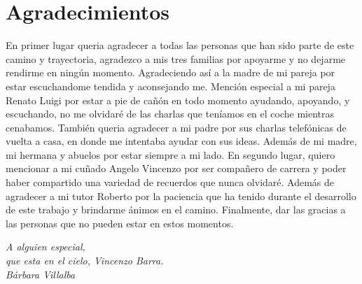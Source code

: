 \cleardoublepage

\chapter*{Agradecimientos}

En primer lugar queria agradecer a todas las personas que han sido parte de este camino y trayectoria, agradezco a mis tres familias por apoyarme y no 
dejarme rendirme en ningún momento. Agradeciendo así a la madre de mi pareja por estar escuchandome tendida y aconsejando me. \newline
\newline
Mención especial a mi pareja Renato Luigi por estar a pie de cañón en todo momento ayudando, apoyando, y escuchando, no me olvidaré de las charlas que teníamos
en el coche mientras cenabamos. También queria agradecer a mi padre por sus charlas telefónicas de vuelta a casa, en donde me intentaba ayudar con sus ideas. Además de mi madre,
mi hermana y abuelos por estar siempre a mi lado.\newline
\newline
En segundo lugar, quiero mencionar a mi cuñado Angelo Vincenzo por ser compañero de carrera y poder haber compartido una variedad de recuerdos que nunca olvidaré. \newline
\newline
Además de agradecer a mi tutor Roberto por la paciencia que ha tenido durante el desarrollo de este trabajo y brindarme ánimos en el camino. \newline
\newline
Finalmente, dar las gracias a las personas que no pueden estar en estos momentos.


\begin{flushright}
	\vspace{4.0 cm}
	\emph{A alguien especial,\\
    que esta en el cielo, Vincenzo Barra.}\\
	\emph{Bárbara Villalba}
\end{flushright}

\thispagestyle{empty}

